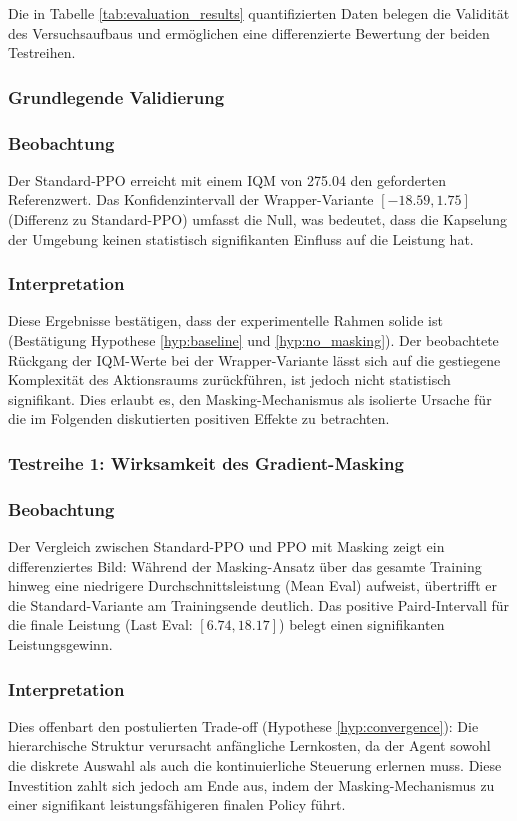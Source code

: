 Die in Tabelle \ref{tab:evaluation_results} quantifizierten Daten belegen die Validität des Versuchsaufbaus und ermöglichen eine differenzierte Bewertung der beiden Testreihen.

\subsubsection{Grundlegende Validierung}

\subsubsection*{Beobachtung}
Der Standard-\ac{PPO} erreicht mit einem \ac{IQM} von 275.04 den geforderten Referenzwert. Das Konfidenzintervall der Wrapper-Variante $[-18.59, 1.75]$ (Differenz zu Standard-\ac{PPO}) umfasst die Null, was bedeutet, dass die Kapselung der Umgebung keinen statistisch signifikanten Einfluss auf die Leistung hat.

\subsubsection*{Interpretation}
Diese Ergebnisse bestätigen, dass der experimentelle Rahmen solide ist (Bestätigung Hypothese \ref{hyp:baseline} und \ref{hyp:no_masking}). Der beobachtete Rückgang der \ac{IQM}-Werte bei der Wrapper-Variante lässt sich auf die gestiegene Komplexität des Aktionsraums zurückführen, ist jedoch nicht statistisch signifikant. Dies erlaubt es, den Masking-Mechanismus als isolierte Ursache für die im Folgenden diskutierten positiven Effekte zu betrachten.

\subsubsection{Testreihe 1: Wirksamkeit des Gradient\hyp{}Masking}

\subsubsection*{Beobachtung}
Der Vergleich zwischen Standard-\ac{PPO} und \ac{PPO} mit Masking zeigt ein differenziertes Bild: Während der Masking-Ansatz über das gesamte Training hinweg eine niedrigere Durchschnittsleistung (Mean Eval) aufweist, übertrifft er die Standard-Variante am Trainingsende deutlich. Das positive Paird-Intervall für die finale Leistung (Last Eval: $[6.74, 18.17]$) belegt einen signifikanten Leistungsgewinn.

\subsubsection*{Interpretation}
Dies offenbart den postulierten Trade-off (Hypothese \ref{hyp:convergence}): Die hierarchische Struktur verursacht anfängliche Lernkosten, da der Agent sowohl die diskrete Auswahl als auch die kontinuierliche Steuerung erlernen muss. Diese Investition zahlt sich jedoch am Ende aus, indem der Masking-Mechanismus zu einer signifikant leistungsfähigeren finalen Policy führt.

